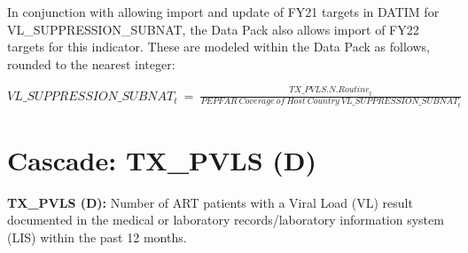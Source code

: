 \documentclass[
  openany]{book}
\begin{document}
In conjunction with allowing import and update of FY21 targets in DATIM
for VL\_SUPPRESSION\_SUBNAT, the Data Pack also allows import of FY22
targets for this indicator. These are modeled within the Data Pack as
follows, rounded to the nearest integer:

\begin{center} ${VL\_ SUPPRESSION\_ SUBNAT}_{t}\  = \ \frac{{TX\_ PVLS.N.Routine}_{t}}{{PEPFAR\ Coverage\ of\ Host\ Country\ VL\_ SUPPRESSION\_ SUBNAT}_{t}}$ \end{center}

\hypertarget{cascade-tx_pvls-d}{%
\section{Cascade: TX\_PVLS (D)}\label{cascade-tx_pvls-d}}

\textbf{TX\_PVLS (D):} Number of ART patients with a Viral Load (VL) result
documented in the medical or laboratory records/laboratory information
system (LIS) within the past 12 months.

\begin{table}
\centering\begingroup\fontsize{12}{14}\selectfont

\endgroup{}
\end{table}
\end{document}
